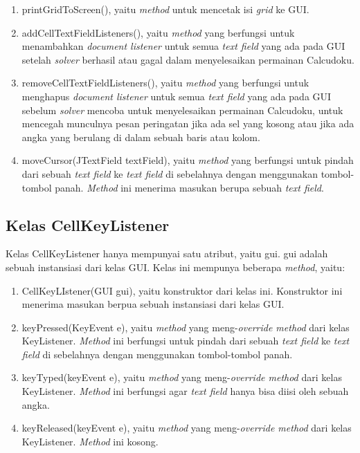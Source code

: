 \begin{enumerate}
\item printGridToScreen(), yaitu \textit{method} untuk mencetak isi \textit{grid} ke GUI.
\item addCellTextFieldListeners(), yaitu \textit{method} yang berfungsi untuk menambahkan \textit{document listener} untuk semua \textit{text field} yang ada pada GUI setelah \textit{solver} berhasil atau gagal dalam menyelesaikan permainan Calcudoku.
\item removeCellTextFieldListeners(), yaitu \textit{method} yang berfungsi untuk menghapus \textit{document listener} untuk semua \textit{text field} yang ada pada GUI sebelum \textit{solver} mencoba untuk menyelesaikan permainan Calcudoku, untuk mencegah munculnya pesan peringatan jika ada sel yang kosong atau jika ada angka yang berulang di dalam sebuah baris atau kolom.
\item moveCursor(JTextField textField), yaitu \textit{method} yang berfungsi untuk pindah dari sebuah \textit{text field} ke \textit{text field} di sebelahnya dengan menggunakan tombol-tombol panah. \textit{Method} ini menerima masukan berupa sebuah \textit{text field}.
\end{enumerate}

\subsection{Kelas CellKeyListener}
\label{sec:kelascellkeylistener}

Kelas CellKeyListener hanya mempunyai satu atribut, yaitu gui. gui adalah sebuah instansiasi dari kelas GUI. Kelas ini mempunya beberapa \textit{method}, yaitu:

\begin{enumerate}
\item CellKeyLIstener(GUI gui), yaitu konstruktor dari kelas ini. Konstruktor ini menerima masukan berpua sebuah instansiasi dari kelas GUI.
\item keyPressed(KeyEvent e), yaitu \textit{method} yang meng-\textit{override method} dari kelas KeyListener. \textit{Method} ini berfungsi untuk pindah dari sebuah \textit{text field} ke \textit{text field} di sebelahnya dengan menggunakan tombol-tombol panah.
\item keyTyped(keyEvent e), yaitu \textit{method} yang meng-\textit{override method} dari kelas KeyListener. \textit{Method} ini berfungsi agar \textit{text field} hanya bisa diisi oleh sebuah angka.
\item keyReleased(keyEvent e), yaitu \textit{method} yang meng-\textit{override method} dari kelas KeyListener. \textit{Method} ini kosong.
\end{enumerate}

